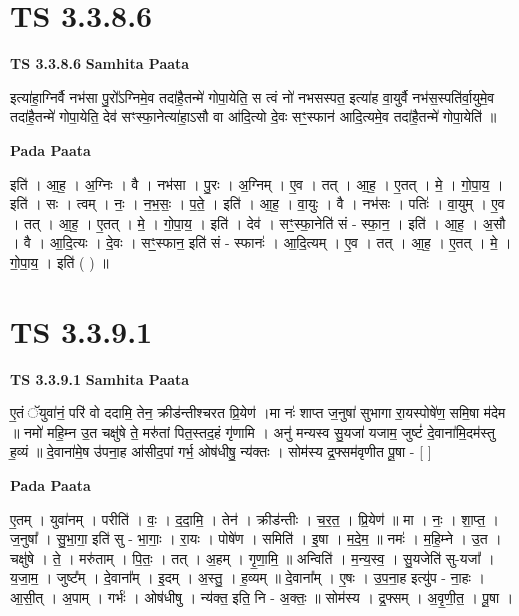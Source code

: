\documentclass[17pt]{extarticle}
\begin{document}

\section{ TS 3.3.8.6 }

\textbf{TS 3.3.8.6 } \newline
\textbf{Samhita Paata} \newline

इत्या॑हा॒ग्निर्वै नभ॑सा पु॒रो᳚ऽग्निमे॒व तदा॑है॒तन्मे॑ गोपा॒येति॒ स त्वं नो॑ नभसस्पत॒ इत्या॑ह वा॒युर्वै नभ॑स॒स्पति॑र्वा॒युमे॒व तदा॑है॒तन्मे॑ गोपा॒येति॒ देव॑ सꣳस्फा॒नेत्या॑हा॒ऽसौ वा आ॑दि॒त्यो दे॒वः सꣳ॒॒स्फान॑ आदि॒त्यमे॒व तदा॑है॒तन्मे॑ गोपा॒येति॑ ॥ \newline

\textbf{Pada Paata} \newline

इति॑ । आ॒ह॒ । अ॒ग्निः । वै । नभ॑सा । पु॒रः । अ॒ग्निम् । ए॒व । तत् । आ॒ह॒ । ए॒तत् । मे॒ । गो॒पा॒य॒ । इति॑ । सः । त्वम् । नः॒ । न॒भ॒सः॒ । प॒ते॒ । इति॑ । आ॒ह॒ । वा॒युः । वै । नभ॑सः । पतिः॑ । वा॒युम् । ए॒व । तत् । आ॒ह॒ । ए॒तत् । मे॒ । गो॒पा॒य॒ । इति॑ । देव॑ । सꣳ॒॒स्फा॒नेति॑ सं - स्फा॒न॒ । इति॑ । आ॒ह॒ । अ॒सौ । वै । आ॒दि॒त्यः । दे॒वः । सꣳ॒॒स्फान॒ इति॑ सं - स्फानः॑ । आ॒दि॒त्यम् । ए॒व । तत् । आ॒ह॒ । ए॒तत् । मे॒ । गो॒पा॒य॒ । इति॑ ( ) ॥  \newline





\section{ TS 3.3.9.1 }

\textbf{TS 3.3.9.1 } \newline
\textbf{Samhita Paata} \newline

ए॒तं ॅयुवा॑नं॒ परि॑ वो ददामि॒ तेन॒ क्रीड॑न्तीश्चरत प्रि॒येण॑ ।मा नः॑ शाप्त ज॒नुषा॑ सुभागा रा॒यस्पोषे॑ण॒ समि॒षा म॑देम ॥ नमो॑ महि॒म्न उ॒त चक्षु॑षे ते॒ मरु॑तां पित॒स्तद॒हं गृ॑णामि । अनु॑ मन्यस्व सु॒यजा॑ यजाम॒ जुष्टं॑ दे॒वाना॑मि॒दम॑स्तु ह॒व्यं ॥ दे॒वाना॑मे॒ष उ॑पना॒ह आ॑सीद॒पां गर्भ॒ ओष॑धीषु॒ न्य॑क्तः । सोम॑स्य द्र॒फ्सम॑वृणीत पू॒षा - [  ] \newline

\textbf{Pada Paata} \newline

ए॒तम् । युवा॑नम् । परीति॑ । वः॒ । द॒दा॒मि॒ । तेन॑ । क्रीड॑न्तीः । च॒र॒त॒ । प्रि॒येण॑ ॥ मा । नः॒ । शा॒प्त॒ । ज॒नुषा᳚ । सु॒भा॒गा॒ इति॑ सु - भा॒गाः॒ । रा॒यः । पोषे॑ण । समिति॑ । इ॒षा । म॒दे॒म॒ ॥ नमः॑ । म॒हि॒म्ने । उ॒त । चक्षु॑षे । ते॒ । मरु॑ताम् । पि॒तः॒ । तत् । अ॒हम् । गृ॒णा॒मि॒ ॥ अन्विति॑ । म॒न्य॒स्व॒ । सु॒यजेति॑ सु-यजा᳚ । य॒जा॒म॒ । जुष्ट᳚म् । दे॒वाना᳚म् । इ॒दम् । अ॒स्तु॒ । ह॒व्यम् ॥ दे॒वाना᳚म् । ए॒षः । उ॒प॒ना॒ह इत्यु॑प - ना॒हः । आ॒सी॒त् । अ॒पाम् । गर्भः॑ । ओष॑धीषु । न्य॑क्त॒ इति॒ नि - अ॒क्तः॒ ॥ सोम॑स्य । द्र॒फ्सम् । अ॒वृ॒णी॒त॒ । पू॒षा ।  \newline
\end{document}
